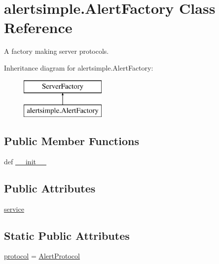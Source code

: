 \hypertarget{classalertsimple_1_1_alert_factory}{\section{alertsimple.\-Alert\-Factory Class Reference}
\label{classalertsimple_1_1_alert_factory}
}


A factory making server protocols.  


Inheritance diagram for alertsimple.\-Alert\-Factory\-:\begin{figure}[H]
\begin{center}
\leavevmode
\includegraphics[height=2.000000cm]{d4/d72/classalertsimple_1_1_alert_factory}
\end{center}
\end{figure}
\subsection*{Public Member Functions}
\begin{DoxyCompactItemize}
\item 
def \hyperlink{classalertsimple_1_1_alert_factory_ad7d79d5bbd7124238dfd97655b0606ba}{\-\_\-\-\_\-init\-\_\-\-\_\-}
\end{DoxyCompactItemize}
\subsection*{Public Attributes}
\begin{DoxyCompactItemize}
\item 
\hyperlink{classalertsimple_1_1_alert_factory_ad63601528dbc68ada0dbbd9078e39205}{service}
\end{DoxyCompactItemize}
\subsection*{Static Public Attributes}
\begin{DoxyCompactItemize}
\item 
\hyperlink{classalertsimple_1_1_alert_factory_a5f1be1638587121071aac8f909c3494d}{protocol} = \hyperlink{classalertsimple_1_1_alert_protocol}{Alert\-Protocol}
\end{DoxyCompactItemize}


